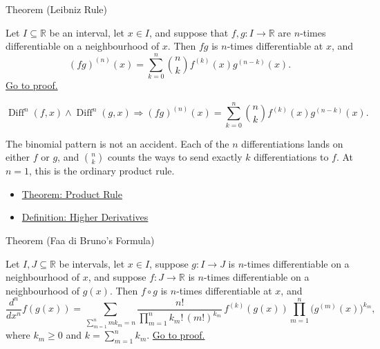 \begin{theorembox}{Theorem (Leibniz Rule)}
\begin{theorem}
\label{thm:leibniz-rule}
Let \(I\subseteq\mathbb{R}\) be an interval, let \(x\in I\), and suppose
that \(f,g:I\to\mathbb{R}\) are \(n\)-times differentiable on a
neighbourhood of \(x\). Then \(fg\) is \(n\)-times differentiable at \(x\),
and
\[
  (fg)^{(n)}(x)
  =
  \sum_{k=0}^{n}\binom{n}{k}f^{(k)}(x)g^{(n-k)}(x).
\]
\hyperref[prf:leibniz-rule]{Go to proof.}
\end{theorem}
\end{theorembox}

\begin{remark*}
\[
  \operatorname{Diff}^{n}(f,x)\land\operatorname{Diff}^{n}(g,x)
  \Longrightarrow
  (fg)^{(n)}(x)
  =
  \sum_{k=0}^{n}\binom{n}{k}f^{(k)}(x)g^{(n-k)}(x).
\]
\end{remark*}

\begin{remark*}[Interpretation]
The binomial pattern is not an accident. Each of the \(n\) differentiations
lands on either \(f\) or \(g\), and \(\binom{n}{k}\) counts the ways to send
exactly \(k\) differentiations to \(f\). At \(n=1\), this is the ordinary
product rule.
\end{remark*}

\begin{dependencies}
\begin{itemize}
  \item \hyperref[thm:product-rule]{Theorem: Product Rule}
  \item \hyperref[def:higher-derivatives]{Definition: Higher Derivatives}
\end{itemize}
\end{dependencies}

\begin{theorembox}{Theorem (Faa di Bruno's Formula)}
\begin{theorem}
\label{thm:faa-di-bruno}
Let \(I,J\subseteq\mathbb{R}\) be intervals, let \(x\in I\), suppose
\(g:I\to J\) is \(n\)-times differentiable on a neighbourhood of \(x\), and
suppose \(f:J\to\mathbb{R}\) is \(n\)-times differentiable on a neighbourhood
of \(g(x)\). Then \(f\circ g\) is \(n\)-times differentiable at \(x\), and
\[
  \frac{d^n}{dx^n}f(g(x))
  =
  \sum_{\sum_{m=1}^{n}mk_m=n}
  \frac{n!}{\prod_{m=1}^{n}k_m!\,(m!)^{k_m}}\,
  f^{(k)}(g(x))
  \prod_{m=1}^{n}\bigl(g^{(m)}(x)\bigr)^{k_m},
\]
where \(k_m\geq0\) and \(k=\sum_{m=1}^{n}k_m\).
\hyperref[prf:faa-di-bruno]{Go to proof.}
\end{theorem}
\end{theorembox}

